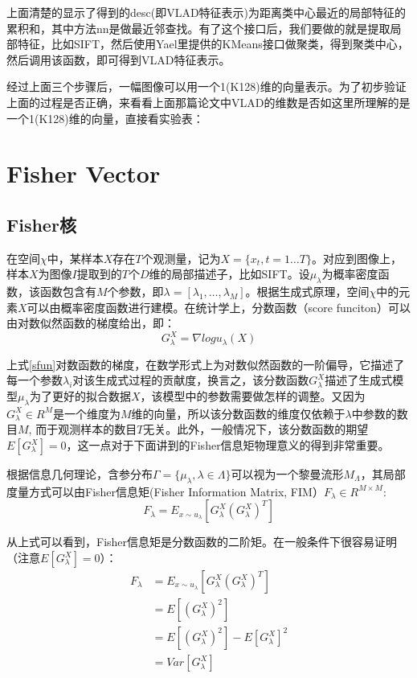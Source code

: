 \documentclass[color=cyan,mathpazo,titlestyle=hang]{elegantbook}
\begin{document}
上面清楚的显示了得到的desc(即VLAD特征表示)为距离类中心最近的局部特征的累积和，其中方法nn是做最近邻查找。有了这个接口后，我们要做的就是提取局部特征，比如SIFT，然后使用Yael里提供的KMeans接口做聚类，得到聚类中心，然后调用该函数，即可得到VLAD特征表示。

经过上面三个步骤后，一幅图像可以用一个1(K128)维的向量表示。为了初步验证上面的过程是否正确，来看看上面那篇论文中VLAD的维数是否如这里所理解的是一个1(K128)维的向量，直接看实验表：

\section{Fisher Vector}

\subsection{Fisher核}

在空间$\chi$中，某样本$X$存在$T$个观测量，记为$X = \lbrace x_t, t=1 \dots T \rbrace$。对应到图像上，样本$X$为图像$I$提取到的$T$个$D$维的局部描述子，比如SIFT。设$\mu_\lambda$为概率密度函数，该函数包含有$M$个参数，即$\lambda = [\lambda_1, \dots, \lambda_M]$。根据生成式原理，空间$\chi$中的元素$X$可以由概率密度函数进行建模。在统计学上，分数函数（score funciton）可以由对数似然函数的梯度给出，即：
\begin{equation}
G^X_\lambda = \nabla log u_\lambda(X)
\label{sfun}
\end{equation}

上式\eqref{sfun}对数函数的梯度，在数学形式上为对数似然函数的一阶偏导，它描述了每一个参数$\lambda_i$对该生成式过程的贡献度，换言之，该分数函数$G^X_\lambda$描述了生成式模型$\mu_\lambda$为了更好的拟合数据$X$，该模型中的参数需要做怎样的调整。又因为$G^X_\lambda \in R^M $是一个维度为$M$维的向量，所以该分数函数的维度仅依赖于$\lambda $中参数的数目$M$, 而于观测样本的数目$T$无关。此外，一般情况下，该分数函数的期望$E[ G^X_\lambda ] = 0 $，这一点对于下面讲到的Fisher信息矩物理意义的得到非常重要。

根据信息几何理论，含参分布$\Gamma = \lbrace \mu_\lambda, \lambda \in \Lambda \rbrace$可以视为一个黎曼流形$M_\Lambda$，其局部度量方式可以由Fisher信息矩(Fisher Information Matrix, FIM）$F_\lambda \in R^{M \times M}$:
\begin{equation}
F_{\lambda} = E_{ x \sim u_\lambda } [ G^X_\lambda (G^X_\lambda)^T ]
\label{fim}
\end{equation}

从上式可以看到，Fisher信息矩是分数函数的二阶矩。在一般条件下很容易证明（注意$E[ G^X_\lambda ] = 0 $）：
\begin{equation}
\begin{split}
F_{\lambda} &= E_{ x \sim u_\lambda } [ G^X_\lambda (G^X_\lambda)^T ] \\
            &= E[(G^X_\lambda)^2] \\
            &= E[(G^X_\lambda)^2] - E[ G^X_\lambda ]^2 \\
            &= Var[G^X_\lambda]
\end{split}
\label{fim1}
\end{equation}
\end{document}
